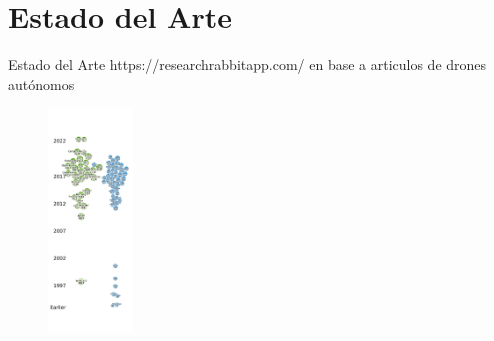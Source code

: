 \documentclass[
  24pt, %
  aspectratio=169, %
]{beamer}
\begin{document}
\section{Estado del Arte}
\begin{frame}{Estado del Arte}
  \tiny https://researchrabbitapp.com/ en base a articulos de drones autónomos
  \begin{figure}
    \centering
    \includegraphics[width=0.2\textwidth]{soa_graph}
  \end{figure}
\end{frame}
\end{document}
